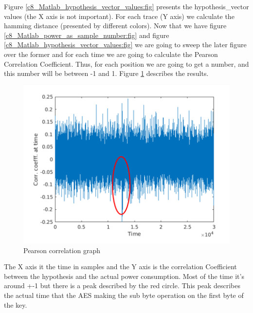 Figure \ref{c8_Matlab_hypothesis_vector_values:fig} presents the hypothesis\_vector values (the X axis is not important). For each trace (Y axis) we calculate the hamming distance (presented by different colors). 
Now that we have figure \ref{c8_Matlab_power_as_sample_number:fig} and figure \ref{c8_Matlab_hypothesis_vector_values:fig} we are going to sweep the later figure over the former and for  each time we are going to calculate the Pearson Correlation Coefficient. Thus, for each position we are going to get a number, and this number will be between -1 and 1. Figure \ref{c8_Matlab_pearson_correlation:fig} describes the results. 
\begin{figure}[H]
    \centering
    \includegraphics[width=1.0\textwidth]{images/chapter8/pearson_correlation_numbers.png}
    \caption{Pearson correlation graph} \label{c8_Matlab_pearson_correlation:fig}
\end{figure}
The X axis it the time in samples and the Y axis is the correlation Coefficient between the hypothesis and the actual power consumption. Most of the time it’s around +-1 but there is a peak described by the red circle. This peak describes the actual time that the AES making the sub byte operation on the first byte of the key. 

